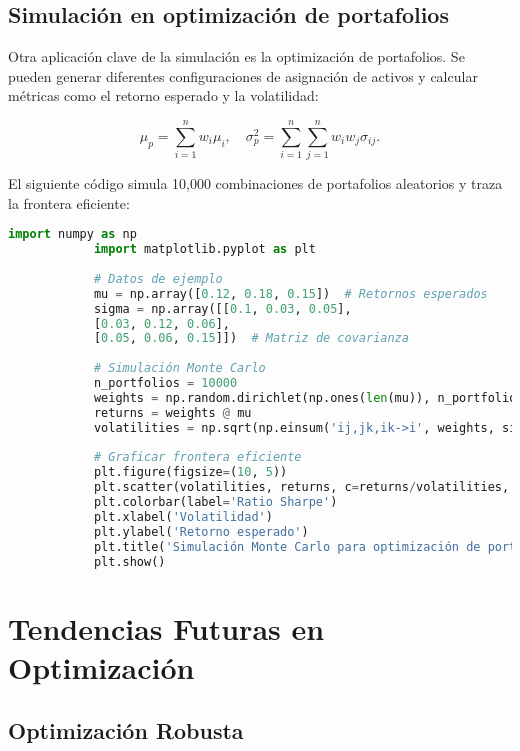 \begin{itemize}
		\subsection{Simulación en optimización de portafolios}
		
		Otra aplicación clave de la simulación es la optimización de portafolios. Se pueden generar diferentes configuraciones de asignación de activos y calcular métricas como el retorno esperado y la volatilidad:
		
		\begin{equation}
			\mu_p = \sum_{i=1}^{n} w_i \mu_i, \quad \sigma_p^2 = \sum_{i=1}^{n} \sum_{j=1}^{n} w_i w_j \sigma_{ij}.
		\end{equation}
		
		El siguiente código simula 10,000 combinaciones de portafolios aleatorios y traza la frontera eficiente:
		
		\begin{lstlisting}[language=Python, caption={Optimización de portafolios mediante simulación de Monte Carlo}]
			import numpy as np
			import matplotlib.pyplot as plt
			
			# Datos de ejemplo
			mu = np.array([0.12, 0.18, 0.15])  # Retornos esperados
			sigma = np.array([[0.1, 0.03, 0.05],
			[0.03, 0.12, 0.06],
			[0.05, 0.06, 0.15]])  # Matriz de covarianza
			
			# Simulación Monte Carlo
			n_portfolios = 10000
			weights = np.random.dirichlet(np.ones(len(mu)), n_portfolios)
			returns = weights @ mu
			volatilities = np.sqrt(np.einsum('ij,jk,ik->i', weights, sigma, weights))
			
			# Graficar frontera eficiente
			plt.figure(figsize=(10, 5))
			plt.scatter(volatilities, returns, c=returns/volatilities, cmap='viridis', alpha=0.5)
			plt.colorbar(label='Ratio Sharpe')
			plt.xlabel('Volatilidad')
			plt.ylabel('Retorno esperado')
			plt.title('Simulación Monte Carlo para optimización de portafolios')
			plt.show()
		\end{lstlisting}
		
		\section{Tendencias Futuras en Optimización}
		\subsection{Optimización Robusta}

\end{itemize}
